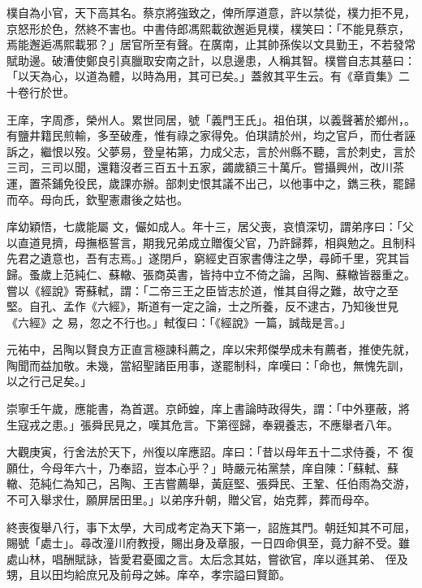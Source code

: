 \begin{pinyinscope}
 樸自為小官，天下高其名。蔡京將強致之，俾所厚道意，許以禁從，樸力拒不見，京怒形於色，然終不害也。中書侍郎馮熙載欲邂逅見樸，樸笑曰：「不能見蔡京，焉能邂逅馮熙載邪？」居官所至有聲。在廣南，止其帥孫俟以文具勤王，不若發常賦助邊。破漕使鄭良引真臘取安南之計，以息邊患，人稱其智。樸嘗自志其墓曰：「以天為心，以道為體，以時為用，其可已矣。」蓋敘其平生云。有《章貢集》二十卷行於世。



 王庠，字周彥，榮州人。累世同居，號「義門王氏」。祖伯琪，以義聲著於鄉州，。有鹽井籍民煎輸，多至破產，惟有祿之家得免。伯琪請於州，均之官戶，而仕者誣訴之，繼恨以歿。父夢易，登皇祐第，力成父志，言於州縣不聽，言於刺史，言於三司，三司以聞，還籍沒者三百五十五家，蠲歲額三十萬斤。嘗攝興州，改川茶運，置茶鋪免役民，歲課亦辦。部刺史恨其議不出己，以他事中之，鐫三秩，罷歸而卒。母向氏，欽聖憲肅後之姑也。



 庠幼穎悟，七歲能屬
 文，儼如成人。年十三，居父喪，哀憤深切，謂弟序曰：「父以直道見擠，母撫柩誓言，期我兄弟成立贈復父官，乃許歸葬，相與勉之。且制科先君之遺意也，吾有志焉。」遂閉戶，窮經史百家書傳注之學，尋師千里，究其旨歸。蚤歲上范純仁、蘇轍、張商英書，皆持中立不倚之論，呂陶、蘇轍皆器重之。嘗以《經說》寄蘇軾，謂：「二帝三王之臣皆志於道，惟其自得之難，故守之至堅。自孔、孟作《六經》，斯道有一定之論，士之所養，反不逮古，乃知後世見《六經》之
 易，忽之不行也。」軾復曰：「《經說》一篇，誠哉是言。」



 元祐中，呂陶以賢良方正直言極諫科薦之，庠以宋邦傑學成未有薦者，推使先就，陶聞而益加敬。未幾，當紹聖諸臣用事，遂罷制科，庠嘆曰：「命也，無愧先訓，以之行己足矣。」



 崇寧壬午歲，應能書，為首選。京師蝗，庠上書論時政得失，謂：「中外壅蔽，將生寇戎之患。」張舜民見之，嘆其危言。下第徑歸，奉親養志，不應舉者八年。



 大觀庚寅，行舍法於天下，州復以庠應詔。庠曰：「昔以母年五十二求侍養，不
 復願仕，今母年六十，乃奉詔，豈本心乎？」時嚴元祐黨禁，庠自陳：「蘇軾、蘇轍、范純仁為知己，呂陶、王吉嘗薦舉，黃庭堅、張舜民、王鞏、任伯雨為交游，不可入舉求仕，願屏居田里。」以弟序升朝，贈父官，始克葬，葬而母卒。



 終喪復舉八行，事下太學，大司成考定為天下第一，詔旌其門。朝廷知其不可屈，賜號「處士」。尋改潼川府教授，賜出身及章服，一日四命俱至，竟力辭不受。雖處山林，唱酬賦詠，皆愛君憂國之言。太后念其姑，嘗欲官，庠以遜其弟、
 侄及甥，且以田均給庶兄及前母之姊。庠卒，孝宗謚曰賢節。




\end{pinyinscope}
